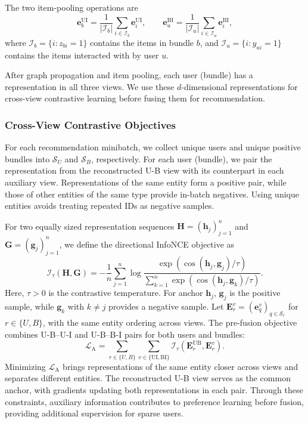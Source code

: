 \documentclass[letterpaper]{article}
\begin{document}
The two item-pooling operations are
\begin{equation}
\mathbf e_b^{\mathrm{UI}}
=\frac{1}{|\mathcal I_b|}
\sum_{i\in\mathcal I_b}\mathbf e_i^{\mathrm{UI}},
\qquad
\mathbf e_u^{\mathrm{BI}}
=\frac{1}{|\mathcal I_u|}
\sum_{i\in\mathcal I_u}\mathbf e_i^{\mathrm{BI}},
\tag{12}
\end{equation}
where $\mathcal I_b=\{i:z_{bi}=1\}$ contains the items in bundle $b$, and $\mathcal I_u=\{i:y_{ui}=1\}$ contains the items interacted with by user $u$.

After graph propagation and item pooling, each user (bundle) has a representation in all three views. We use these $d$-dimensional representations for cross-view contrastive learning before fusing them for recommendation.

\subsubsection{Cross-View Contrastive Objectives}

For each recommendation minibatch, we collect unique users and unique positive bundles into $\mathcal S_U$ and $\mathcal S_B$, respectively. For each user (bundle), we pair the representation from the reconstructed U-B view with its counterpart in each auxiliary view. Representations of the same entity form a positive pair, while those of other entities of the same type provide in-batch negatives. Using unique entities avoids treating repeated IDs as negative samples.

For two equally sized representation sequences $\mathbf H=(\mathbf h_j)_{j=1}^{n}$ and $\mathbf G=(\mathbf g_j)_{j=1}^{n}$, we define the directional InfoNCE objective \cite{oord2018cpc} as
\begin{equation}
\mathcal I_\tau(\mathbf H,\mathbf G)
=-\frac{1}{n}\sum_{j=1}^{n}
\log
\frac{\exp\!\left(\cos(\mathbf h_j,\mathbf g_j)/\tau\right)}
{\sum_{k=1}^{n}
\exp\!\left(\cos(\mathbf h_j,\mathbf g_k)/\tau\right)}.
\tag{13}
\end{equation}
Here, $\tau>0$ is the contrastive temperature. For anchor $\mathbf h_j$, $\mathbf g_j$ is the positive sample, while $\mathbf g_k$ with $k\neq j$ provides a negative sample. Let $\mathbf E_r^v=(\mathbf e_q^v)_{q\in\mathcal S_r}$ for $r\in\{U,B\}$, with the same entity ordering across views. The pre-fusion objective combines U-B--U-I and U-B--B-I pairs for both users and bundles:
\begin{equation}
\mathcal L_{\mathrm A}
=\sum_{r\in\{U,B\}}
\sum_{v\in\{\mathrm{UI},\mathrm{BI}\}}
\mathcal I_\tau\!\left(\mathbf E_r^{\mathrm{UB}},\mathbf E_r^v\right).
\tag{14}
\end{equation}
Minimizing $\mathcal L_{\mathrm A}$ brings representations of the same entity closer across views and separates different entities. The reconstructed U-B view serves as the common anchor, with gradients updating both representations in each pair. Through these constraints, auxiliary information contributes to preference learning before fusion, providing additional supervision for sparse users.
\end{document}
